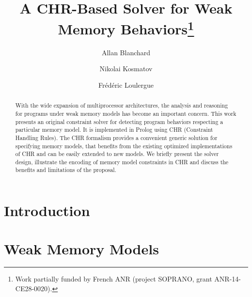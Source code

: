 \documentclass[EPiC]{easychair}
\title{A CHR-Based Solver for Weak Memory Behaviors\thanks{Work 
partially funded by French ANR (project SOPRANO, grant ANR-14-CE28-0020).}}
\author{
   Allan Blanchard\inst{1,2}
\and
   Nikolai Kosmatov\inst{1}
\and
   Frédéric Loulergue\inst{2}
}
\institute{
  CEA, LIST, Software Reliability Laboratory,
  PC 174, 91191 Gif-sur-Yvette France\\
  \email{firstname.lastname@cea.fr}
\and
  Univ Orléans, INSA Centre Val de Loire, LIFO EA 4022, Orléans, France%
}
\begin{document}
\maketitle

\begin{abstract}
  With the wide expansion of multiprocessor architectures, the
  analysis and reasoning for programs under weak memory models has
  become an important concern.  This work presents an original
  constraint solver for detecting program behaviors respecting a
  particular memory model.  It is implemented in Prolog using CHR
  (Constraint Handling Rules).  The CHR formalism provides a
  convenient generic solution for specifying memory models, that
  benefits from the existing optimized implementations of CHR and can
  be easily extended to new models.  We briefly present the solver
  design, illustrate the encoding of memory model constraints in CHR
  and discuss the benefits and limitations of the proposal.
\end{abstract}



%
%

\pagestyle{empty}

\section{Introduction}
\label{sect:introduction}


\section{Weak Memory Models}
\label{sect:weakMemoryModels}

\end{document}
